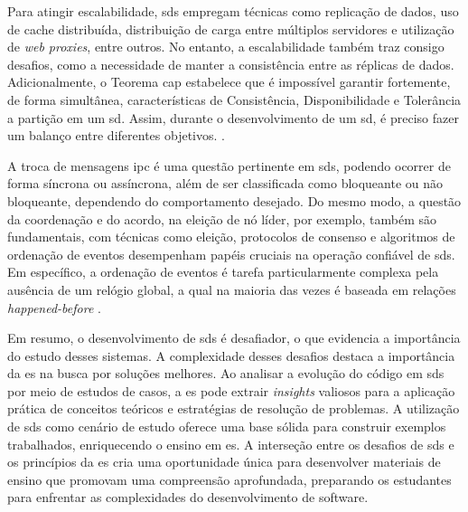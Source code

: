 Para atingir escalabilidade, \gls{sds} empregam técnicas como replicação de dados, uso de cache distribuída, distribuição de carga entre múltiplos servidores e utilização de \textit{web proxies}, entre outros. No entanto, a escalabilidade também traz consigo desafios, como a necessidade de manter a consistência entre as réplicas de dados. Adicionalmente, o Teorema \gls{cap} estabelece que é impossível garantir fortemente, de forma simultânea, características de Consistência, Disponibilidade e Tolerância a partição em um \gls{sd}. Assim, durante o desenvolvimento de um \gls{sd}, é preciso fazer um balanço entre diferentes objetivos.  \cite{TwentyYearsLaterEricBrewer2012}.

A troca de mensagens \gls{ipc} é uma questão pertinente em \gls{sds}, podendo ocorrer de forma síncrona ou assíncrona, além de ser classificada como bloqueante ou não bloqueante, dependendo do comportamento desejado. Do mesmo modo, a questão da coordenação e do acordo, na eleição de nó líder, por exemplo, também são fundamentais, com técnicas como eleição, protocolos de consenso e algoritmos de ordenação de eventos desempenham papéis cruciais na operação confiável de \gls{sds}. Em específico, a ordenação de eventos é tarefa particularmente complexa pela ausência de um relógio global, a qual na maioria das vezes é baseada em relações \textit{happened-before} \cite{DistributedSystemsCoulouris}.

Em resumo, o desenvolvimento de \gls{sds} é desafiador, o que evidencia a importância do estudo desses sistemas. A complexidade desses desafios destaca a importância da \gls{es} na busca por soluções melhores. Ao analisar a evolução do código em \gls{sds} por meio de estudos de casos, a \gls{es} pode extrair \textit{insights} valiosos para a aplicação prática de conceitos teóricos e estratégias de resolução de problemas. A utilização de \gls{sds} como cenário de estudo oferece uma base sólida para construir exemplos trabalhados, enriquecendo o ensino em \gls{es}. A interseção entre os desafios de \gls{sds} e os princípios da \gls{es} cria uma oportunidade única para desenvolver materiais de ensino que promovam uma compreensão aprofundada, preparando os estudantes para enfrentar as complexidades do desenvolvimento de software.

